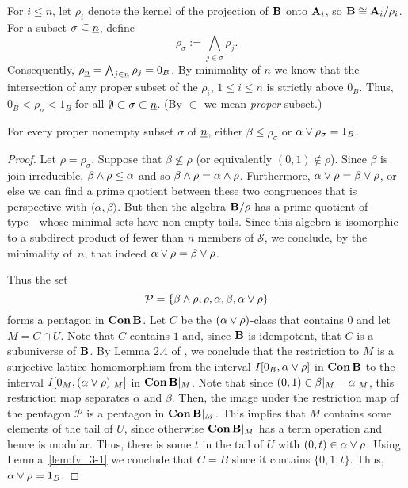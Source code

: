 For $i \leq n$, let $\rho_i$ denote the kernel of the projection of $\mathbf{B}$ onto $\mathbf{A}_i$,
so $\mathbf{B} \cong \mathbf{A}_i/\rho_i$.
For a subset $\sigma \subseteq \underline{n}$, define
\[
\rho_\sigma := \bigwedge_{j\in \sigma} \rho_j.
\]
Consequently,
$\rho_{\underline{n}} = \bigwedge_{j\in \underline{n}}\rho_j = 0_{B}$.
By minimality of $n$ we know that the intersection of any  proper subset of the
$\rho_i$, $1 \leq i \leq n$ is strictly above $0_B$.  Thus,
$0_B < \rho_\sigma < 1_B$ for all 
$\emptyset \subset \sigma\subset \underline{n}$.
(By $\subset$ we mean \emph{proper} subset.)

\begin{lemma}
  \label{lem:fv_3-2}
  For every proper nonempty subset $\sigma$ of $\underline{n}$,
  either $\beta \leq \rho_\sigma$ or $\alpha \join \rho_\sigma = 1_B$.
\end{lemma}
\begin{proof} Let $\rho = \rho_\sigma$.
Suppose that $\beta \not\le {\rho}$ (or equivalently $(0,1) \notin
\rho$). Since $\beta$ is join irreducible, $\beta\meet\rho \le
\alpha$ and so $\beta\meet \rho = \alpha \meet \rho$.  Furthermore,
$\alpha\join {\rho} = \beta \join {\rho}$, or else we can find a
prime quotient between these two congruences that is perspective
with $\langle \alpha, \beta \rangle$.  But then the algebra 
$\mathbf{B}/{\rho}$ has a prime quotient of type~\atyp\ whose minimal sets have non-empty
tails.  Since this algebra is isomorphic to a subdirect product of
fewer than $n$ members of $\mathcal S$, we conclude, by the minimality 
of~$n$, that indeed $\alpha\join {\rho} = \beta \join {\rho}$.

Thus the set
\[
\mathcal P = \{\beta\meet\rho, \rho, \alpha, \beta, \alpha\join\rho\}
\]
forms a pentagon in $\operatorname{\mathbf{Con}} \mathbf{B}$. Let $C$ be the
$(\alpha\join\rho)$-class that contains $0$ and let $M = C\mathrel{\cap} U$.
Note that $C$ contains $1$ and, since $\mathbf{B}$ is idempotent,  that
$C$ is a subuniverse of $\mathbf{B}$. By Lemma 2.4 of \cite{HM:1988}, we
conclude that the restriction to $M$ is a surjective lattice
homomorphism from the interval $I[0_B,
\alpha\join\rho]$ in $\operatorname{\mathbf{Con}}{\mathbf{B}}$ to the interval $I[0_M,
(\alpha\join\rho)|_M]$ in $\operatorname{\mathbf{Con}}{\mathbf{B}}|_M$.  Note that since $(0,1) \in
\beta|_M - \alpha|_M$, this restriction map separates
$\alpha$ and $\beta$.  Then, the image under the restriction map of
the pentagon $\mathcal P$ is a pentagon in $\operatorname{\mathbf{Con}}{\mathbf{B}}|_M$.  This
implies that $M$ contains some elements of the tail of $U$, since
otherwise $\operatorname{\mathbf{Con}}{\mathbf{B}}|_M$ has a \malcev term operation and hence  
is modular.
Thus, there is some $t$ in the tail of $U$ with $(0,t) \in
\alpha\join \rho$. Using Lemma~\ref{lem:fv_3-1} we conclude that $C =
B$ since it contains $\{0,1,t\}$.  Thus, $\alpha \join \rho = 1_B$.
\end{proof}

